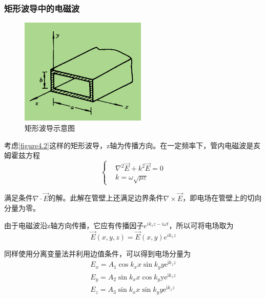 \documentclass[UTF8]{ctexart}
\begin{document}
    \subsubsection{矩形波导中的电磁波}
    \begin{figure}
        \centering
        \includegraphics[width=6cm]{figure4-2.png}
        \caption{矩形波导示意图}
        \label{figure4.2}
    \end{figure}

    考虑\autoref{figure4.2}这样的矩形波导，z轴为传播方向。在一定频率下，管内电磁波是亥姆霍兹方程
    \begin{equation}
        \left \{ \begin{aligned}
            & \nabla^2 \vec{E} + k^2 \vec{E} = 0 \\
            & k = \omega \sqrt{\mu \varepsilon}
        \end{aligned} \right.
    \end{equation}

\noindent 满足条件$\nabla \cdot \vec{E}$的解。此解在管壁上还满足边界条件$\nabla \times \vec{E}$，即电场在管壁上的切向分量为零。

    由于电磁波沿z轴方向传播，它应有传播因子$e^{i k_z z - i \omega t}$，所以可将电场取为
    \begin{equation}
        \vec{E}(x,y,z) = \vec{E}(x,y)e^{i k_z z}
    \end{equation}

\noindent 同样使用分离变量法并利用边值条件，可以得到电场分量为
\begin{equation}
\begin{array}{l}{E_{x}=A_{1} \cos k_{x} x \sin k_{y} y \mathrm{e}^{\mathrm{i} k_{z} z}} \\ {E_{y}=A_{2} \sin k_{x} x \cos k_{y} \mathrm{y} \mathrm{e}^{\mathrm{i} k_{z} z}} \\ {E_{z}=A_{3} \sin k_{x} x \sin k_{y} y \mathrm{e}^{\mathrm{i} k_{z} z}}\end{array}
\end{equation}
\end{document}
